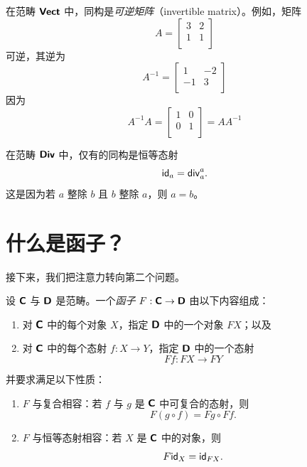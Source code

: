 \begin{example}
    在范畴 ${\boldsymbol{\mathsf{Vect}}}$ 中，同构是{\it 可逆矩阵}（invertible matrix）。例如，矩阵
    \[
    A = \begin{bmatrix}
        3 & 2\\
        1 & 1\\
    \end{bmatrix}
    \]
    可逆，其逆为
    \[
    A^{-1} = \begin{bmatrix}
        1 & -2\\
        -1 & 3\\
    \end{bmatrix}
    \]
    因为
    \[
    A^{-1}A= \begin{bmatrix}
        1 & 0\\
        0 & 1\\
    \end{bmatrix} = AA^{-1}
    \]
\end{example}

\begin{example}
    在范畴 ${\boldsymbol{\mathsf{Div}}}$ 中，仅有的同构是恒等态射
    \[\mathsf{id}_a = \mathsf{div}_a^a.\]
    这是因为若 $a$ 整除 $b$ 且 $b$ 整除 $a$，则 $a = b$。
\end{example}

\section{什么是函子？}
接下来，我们把注意力转向第二个问题。
\begin{definition}
设 ${\boldsymbol{\mathsf{C}}}$ 与 ${\boldsymbol{\mathsf{D}}}$ 是范畴。一个{\it 函子} $F:{\boldsymbol{\mathsf{C}}} \to {\boldsymbol{\mathsf{D}}}$ 由以下内容组成：
\begin{enumerate}
    \item 对 ${\boldsymbol{\mathsf{C}}}$ 中的每个对象 $X$，指定 ${\boldsymbol{\mathsf{D}}}$ 中的一个对象 $FX$；以及
    \item 对 ${\boldsymbol{\mathsf{C}}}$ 中的每个态射 $f:X \to Y$，指定 ${\boldsymbol{\mathsf{D}}}$ 中的一个态射
    \[Ff:FX \to FY\]
\end{enumerate}
并要求满足以下性质：
\begin{enumerate}
    \item $F$ 与复合相容：若 $f$ 与 $g$ 是 ${\boldsymbol{\mathsf{C}}}$ 中可复合的态射，则
    \[
    F(g \circ f) = Fg \circ  Ff.
    \]
    \item $F$ 与恒等态射相容：若 $X$ 是 ${\boldsymbol{\mathsf{C}}}$ 中的对象，则
    \[
    F\mathsf{id}_X = \mathsf{id}_{FX}.
    \]
\end{enumerate}
\end{definition}

